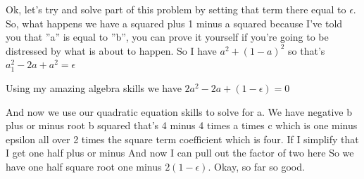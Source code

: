\documentclass[]{article}
\begin{document}
Ok, let's try and solve
part of this problem
by setting that term there equal to $\epsilon$.
So, what happens we have a squared
plus 1 minus a squared
because I've told you that ''a'' is equal to ''b'',
you can prove it yourself if you're going
to be distressed by what is about to happen.
So I have $a^2 + (1-a)^2$ so that's
$a^2_1-2a+a^2=\epsilon$

Using my amazing algebra skills we have
$2a^2-2a+(1-\epsilon)  = 0$

And now we use our quadratic equation
skills to solve for a.
We have negative b plus or minus
root b squared that's 4
minus 4 times a times c
which is one minus epsilon all over
2 times the square term coefficient
which is four.
If I simplify that I get one half plus or minus
And now I can pull out the factor of two here
So we have one half square root one minus
$2(1-\epsilon)$.
Okay, so far so good.
\end{document}
